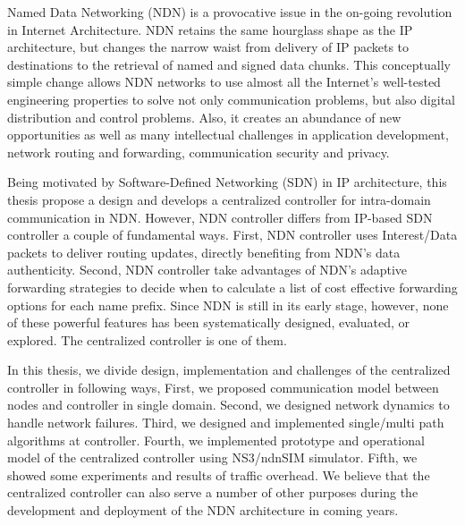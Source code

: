 

Named Data Networking (NDN) is a provocative issue in the on-going revolution in Internet Architecture. NDN retains the same hourglass shape as the IP architecture, but changes the narrow waist from delivery of IP packets to destinations to the retrieval of named and signed data chunks. This conceptually simple change allows NDN networks to use almost all the Internet's well-tested engineering properties to solve not only communication problems, but also digital distribution and control problems. Also, it creates an abundance of new opportunities as well as many intellectual challenges in application development, network routing and forwarding, communication security and privacy.

Being motivated by Software-Defined Networking (SDN) in IP architecture, this thesis propose a design and develops a centralized controller for intra-domain communication in NDN. However, NDN controller differs from IP-based SDN controller a couple of fundamental ways. First, NDN controller uses Interest/Data packets to deliver routing updates, directly benefiting from NDN’s data authenticity. Second, NDN controller take advantages of NDN’s adaptive forwarding strategies to decide when to calculate a list of cost effective forwarding options for each name prefix. Since NDN is still in its early stage, however, none of these powerful features has been systematically designed, evaluated, or explored. The centralized controller is one of them.

In this thesis, we divide design, implementation and challenges of the centralized controller in following ways, First, we proposed communication model between nodes and controller in single domain. Second, we designed network dynamics to handle network failures. Third, we designed and implemented single/multi path algorithms at controller. Fourth, we implemented prototype and operational model of the centralized controller using NS3/ndnSIM simulator. Fifth, we showed some experiments and results of traffic overhead. We believe that the centralized controller can also serve a number of other purposes during the development and deployment of the NDN architecture in coming years.